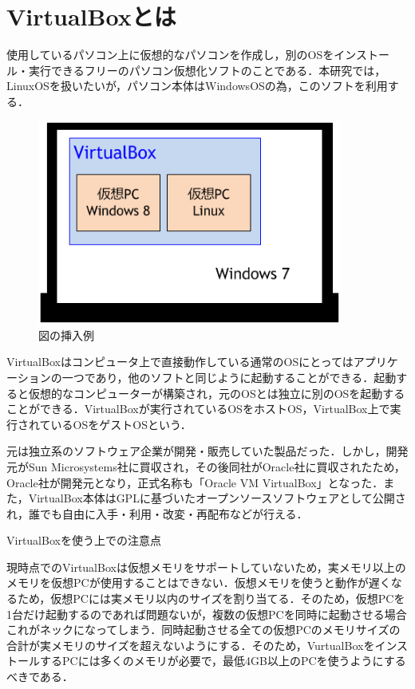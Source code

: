 \section{VirtualBoxとは}

使用しているパソコン上に仮想的なパソコンを作成し，別のOSをインストール・実行できるフリーのパソコン仮想化ソフトのことである．本研究では，LinuxOSを扱いたいが，パソコン本体はWindowsOSの為，このソフトを利用する．


\begin{figure}[H]
\centering
\includegraphics[width=10cm]{sample10.png}
\caption{図の挿入例}\label{サンプル図}
\end{figure}





VirtualBoxはコンピュータ上で直接動作している通常のOSにとってはアプリケーションの一つであり，他のソフトと同じように起動することができる．起動すると仮想的なコンピューターが構築され，元のOSとは独立に別のOSを起動することができる．VirtualBoxが実行されているOSをホストOS，VirtualBox上で実行されているOSをゲストOSという．

元は独立系のソフトウェア企業が開発・販売していた製品だった．しかし，開発元がSun Microsystems社に買収され，その後同社がOracle社に買収されたため，Oracle社が開発元となり，正式名称も「Oracle VM VirtualBox」となった．また，VirtualBox本体はGPLに基づいたオープンソースソフトウェアとして公開され，誰でも自由に入手・利用・改変・再配布などが行える．

VirtualBoxを使う上での注意点

現時点でのVirtualBoxは仮想メモリをサポートしていないため，実メモリ以上のメモリを仮想PCが使用することはできない．仮想メモリを使うと動作が遅くなるため，仮想PCには実メモリ以内のサイズを割り当てる．そのため，仮想PCを1台だけ起動するのであれば問題ないが，複数の仮想PCを同時に起動させる場合これがネックになってしまう．同時起動させる全ての仮想PCのメモリサイズの合計が実メモリのサイズを超えないようにする．そのため，VurtualBoxをインストールするPCには多くのメモリが必要で，最低4GB以上のPCを使うようにするべきである．



